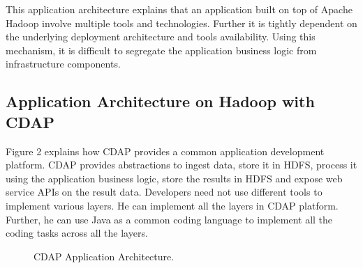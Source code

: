 \documentclass[9pt,twocolumn,twoside]{styles/osajnl}
\begin{document}
This application architecture explains that an application built on top
 of Apache Hadoop involve multiple tools and technologies. Further it is
 tightly dependent on the underlying deployment architecture and tools
 availability. Using this mechanism, it is difficult to segregate the
 application business logic from infrastructure components.

\subsection{Application Architecture on Hadoop with CDAP}
Figure 2 \cite{www-cdap-architecture} explains how CDAP provides a common
application development platform. CDAP provides abstractions to ingest data,
store it in HDFS, process it using the application business logic, store the
results in HDFS and expose web service APIs on the result data. Developers need
 not use different tools to implement various layers. He can implement
  all the layers in CDAP platform. Further, he can use Java as a common coding
 language to implement all the coding tasks across all the layers.

\begin{figure}[htbp]
\centering
{}
\caption{CDAP Application Architecture.}
\label{fig:CDAP Architecture}
\end{figure}
\end{document}
